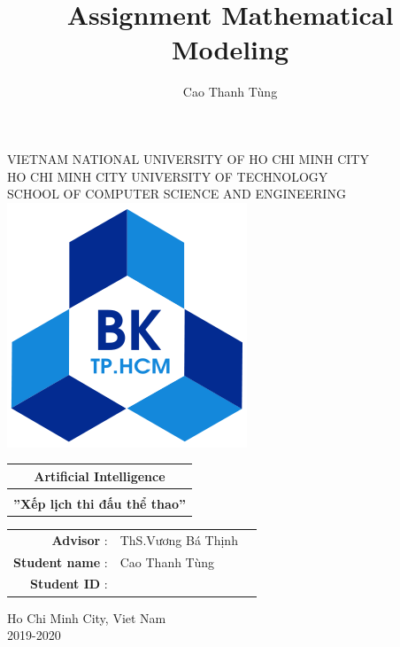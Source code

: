 \documentclass[13pt,a4paper]{article}
\author{Cao Thanh Tùng}
\title{Assignment Mathematical Modeling}
\begin{document}
\sffamily
\begin{titlepage}
\begin{center}
	
	\fontsize{17pt}{27pt}\selectfont
	{VIETNAM NATIONAL UNIVERSITY OF HO CHI MINH CITY}\\

	{HO CHI MINH CITY UNIVERSITY OF TECHNOLOGY}\\
	
	{SCHOOL OF COMPUTER SCIENCE AND ENGINEERING} \\[1.5cm]
	
	
	
	\color{blue} %
	\includegraphics[scale=0.4]{hcmut.png}\\[1.5cm]
	\begin{tabular}{c}
	
	{\fontsize{20pt}{1}\selectfont \color{blue}Artificial Intelligence}\\
	\hline\\
	{\fontsize{25pt}{1}\selectfont \color{blue}\textbf{''Xếp lịch thi đấu thể thao”}}\\[0.5cm]
	\hline
	\end{tabular}
\end{center}
	\begin{flushright}
	\color{blue}
	\begin{tabular}{r l l}
	{\fontsize{14pt}{1}\selectfont \textbf{Advisor} :}&{\fontsize{14pt}{1}\selectfont ThS.Vương Bá Thịnh}&\\[0.5cm]
	{\fontsize{14pt}{1}\selectfont \textbf{Student name} :}&{\fontsize{14pt}{1}\selectfont Cao Thanh Tùng}&\\[0.5cm]
	{\fontsize{14pt}{1}\selectfont \textbf{Student ID} :}&{\fontsize{14pt}{1}\selectfont 1613989}&\\[3.8cm]
	\end{tabular}
	\end{flushright}
	
	\begin{center}
	{Ho Chi Minh City, Viet Nam}\\
	{\footnotesize 2019-2020}
	\end{center}

\end{titlepage}
\end{document}
